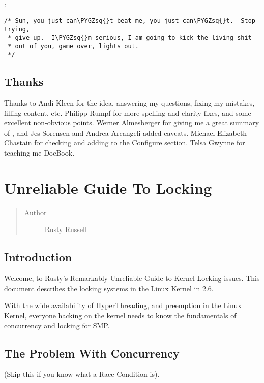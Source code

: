 \documentclass[a4paper,8pt,english]{sphinxmanual}
\def\PYGZsq{\char`\'}
\renewcommand\PYGZsq{\textquotesingle}
\begin{document}
:

\begin{Verbatim}[commandchars=\\\{\}]
/* Sun, you just can\PYGZsq{}t beat me, you just can\PYGZsq{}t.  Stop trying,
 * give up.  I\PYGZsq{}m serious, I am going to kick the living shit
 * out of you, game over, lights out.
 */
\end{Verbatim}


\section{Thanks}
\label{kernel-hacking/hacking:thanks}
Thanks to Andi Kleen for the idea, answering my questions, fixing my
mistakes, filling content, etc. Philipp Rumpf for more spelling and
clarity fixes, and some excellent non-obvious points. Werner Almesberger
for giving me a great summary of , and Jes
Sorensen and Andrea Arcangeli added caveats. Michael Elizabeth Chastain
for checking and adding to the Configure section. Telsa Gwynne for
teaching me DocBook.


\chapter{Unreliable Guide To Locking}
\label{kernel-hacking/locking::doc}\label{kernel-hacking/locking:unreliable-guide-to-locking}\begin{quote}\begin{description}
\item[{Author}] \leavevmode
Rusty Russell

\end{description}\end{quote}


\section{Introduction}
\label{kernel-hacking/locking:introduction}
Welcome, to Rusty's Remarkably Unreliable Guide to Kernel Locking
issues. This document describes the locking systems in the Linux Kernel
in 2.6.

With the wide availability of HyperThreading, and preemption in the
Linux Kernel, everyone hacking on the kernel needs to know the
fundamentals of concurrency and locking for SMP.


\section{The Problem With Concurrency}
\label{kernel-hacking/locking:the-problem-with-concurrency}
(Skip this if you know what a Race Condition is).
\end{document}
